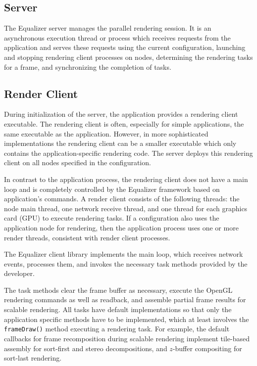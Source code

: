 \subsection{Server}

The Equalizer server manages the parallel rendering session. It is an
asynchronous execution thread or process which receives requests from the
application and serves these requests using the current configuration, launching
and stopping rendering client processes on nodes, determining the rendering
tasks for a frame, and synchronizing the completion of tasks.

\subsection{Render Client}

During initialization of the server, the application provides a rendering client
executable. The rendering client is often, especially for simple applications,
the same executable as the application. However, in more sophisticated
implementations the rendering client can be a smaller executable which only
contains the application-specific rendering code. The server deploys this
rendering client on all nodes specified in the configuration.

In contrast to the application process, the rendering client does not have a
main loop and is completely controlled by the Equalizer framework based on
application's commands. A render client consists of the following threads: the
node main thread, one network receive thread, and one thread for each graphics
card (GPU) to execute rendering tasks. If a configuration also uses the
application node for rendering, then the application process uses one or more
render threads, consistent with render client processes.

The Equalizer client library implements the main loop, which receives network
events, processes them, and invokes the necessary task methods provided by the
developer.

The task methods clear the frame buffer as necessary, execute the OpenGL
rendering commands as well as readback, and assemble partial frame results for
scalable rendering. All tasks have default implementations so that only the
application specific methods have to be implemented, which at least involves the
{\tt frameDraw()} method executing a rendering task. For example, the default
callbacks for frame recomposition during scalable rendering implement tile-based
assembly for sort-first and stereo decompositions, and $z$-buffer compositing
for sort-last rendering.

